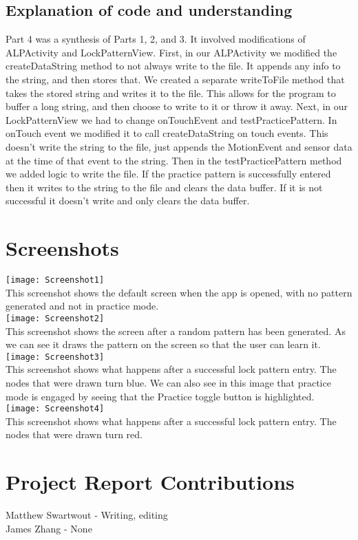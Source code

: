 \documentclass{article}
\begin{document}
\subsection{Explanation of code and understanding}
Part 4 was a synthesis of Parts 1, 2, and 3. It involved modifications of
ALPActivity and LockPatternView.
First, in our ALPActivity we modified the createDataString method to not always
write to the file. It appends any info to the string, and then stores that. We
created a separate writeToFile method that takes the stored string and writes
it to the file. This allows for the program to buffer a long string, and then
choose to write to it or throw it away. 
Next, in our LockPatternView we had to change onTouchEvent and
testPracticePattern. In onTouch event we modified it to call createDataString
on touch events. This doesn't write the string to the file, just appends the
MotionEvent and sensor data at the time of that event to the string. Then in
the testPracticePattern method we added logic to write the file. If the
practice pattern is successfully entered then it writes to the string to the
file and clears the data buffer. If it is not successful it doesn't write and
only clears the data buffer.

\section{Screenshots}
\texttt{[image: Screenshot1]} \\
This screenshot shows the default screen when the app is opened, with no pattern generated and not in practice mode. \\
\texttt{[image: Screenshot2]} \\
This screenshot shows the screen after a random pattern has been generated. As we can see it draws the pattern on the screen so that the user can learn it. \\
\texttt{[image: Screenshot3]} \\
This screenshot shows what happens after a successful lock pattern entry. The nodes that were drawn turn blue. We can also see in this image that practice mode is engaged by seeing that the Practice toggle button is highlighted. \\
\texttt{[image: Screenshot4]} \\
This screenshot shows what happens after a successful lock pattern entry. The nodes that were drawn turn red. \\

\section{Project Report Contributions}
Matthew Swartwout - Writing, editing \\
James Zhang - None
\end{document}
